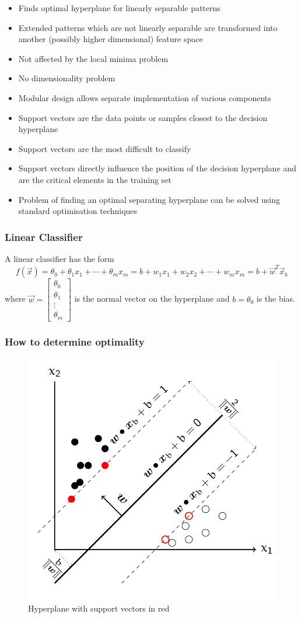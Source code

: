 \documentclass[11pt]{article}
\begin{document}
\begin{itemize}
    \item Finds optimal hyperplane for linearly separable patterns
    \item Extended patterns which are not linearly separable are transformed into another (possibly higher dimensional) feature space
    \item Not affected by the local minima problem
    \item No dimensionality problem
    \item Modular design allows separate implementation of various components
    \item Support vectors are the data points or samples closest to the decision hyperplane
    \item Support vectors are the most difficult to classify
    \item Support vectors directly influence the position of the decision hyperplane and are the critical elements in the training set
    \item Problem of finding an optimal separating hyperplane can be solved using standard optimisation techniques
\end{itemize}

\subsubsection{Linear Classifier}
A linear classifier has the form
\begin{equation}
    f(\vec{x}) = \theta_0 + \theta_1 x_1 + \cdots + \theta_m x_m = b + w_1 x_1 + w_2 x_2 + \cdots + w_m x_m = b + \vec{w}^T \vec{x}_b
\end{equation}
\noindent
where $\vec{w} = \begin{bmatrix}
        \theta_0 \\\theta_1\\\vdots\\\theta_m
    \end{bmatrix}$ is the normal vector on the hyperplane and $b = \theta_0$ is the bias.

\subsubsection{How to determine optimality}

\begin{figure}[htb!]
    \centering
    \includegraphics[keepaspectratio, width=0.4\linewidth]{Pictures/support_vector_machine_hyperplane}
    \caption{Hyperplane with support vectors in red}
    \label{fig:supportvectormachinehyperplane}
\end{figure}
\end{document}
